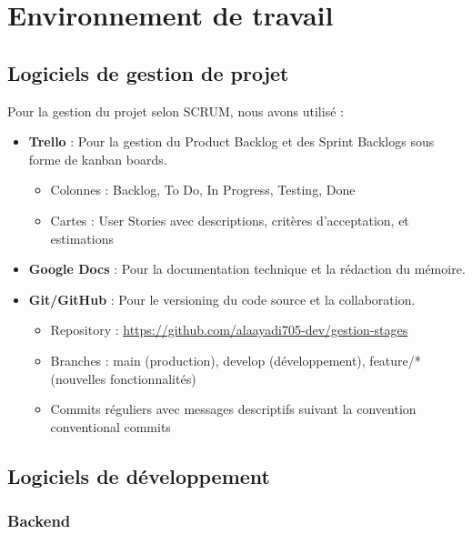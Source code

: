 \documentclass[12pt,a4paper]{report}
\begin{document}
\section{Environnement de travail}

\subsection{Logiciels de gestion de projet}

Pour la gestion du projet selon SCRUM, nous avons utilisé :

\begin{itemize}[leftmargin=1cm]
    \item \textbf{Trello} : Pour la gestion du Product Backlog et des Sprint Backlogs sous forme de kanban boards.
    \begin{itemize}
        \item Colonnes : Backlog, To Do, In Progress, Testing, Done
        \item Cartes : User Stories avec descriptions, critères d'acceptation, et estimations
    \end{itemize}
    
    \item \textbf{Google Docs} : Pour la documentation technique et la rédaction du mémoire.
    
    \item \textbf{Git/GitHub} : Pour le versioning du code source et la collaboration.
    \begin{itemize}
        \item Repository : \url{https://github.com/alaayadi705-dev/gestion-stages}
        \item Branches : main (production), develop (développement), feature/* (nouvelles fonctionnalités)
        \item Commits réguliers avec messages descriptifs suivant la convention conventional commits
    \end{itemize}
\end{itemize}

\subsection{Logiciels de développement}

\subsubsection{Backend}
\end{document}
